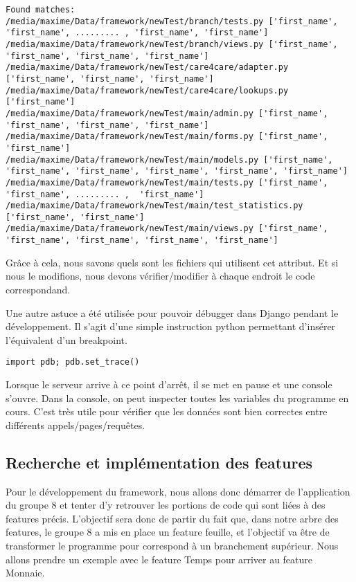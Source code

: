 \begin{lstlisting}
Found matches:
/media/maxime/Data/framework/newTest/branch/tests.py ['first_name', 'first_name', ......... , 'first_name', 'first_name']
/media/maxime/Data/framework/newTest/branch/views.py ['first_name', 'first_name', 'first_name', 'first_name']
/media/maxime/Data/framework/newTest/care4care/adapter.py ['first_name', 'first_name', 'first_name']
/media/maxime/Data/framework/newTest/care4care/lookups.py ['first_name']
/media/maxime/Data/framework/newTest/main/admin.py ['first_name', 'first_name', 'first_name', 'first_name']
/media/maxime/Data/framework/newTest/main/forms.py ['first_name', 'first_name']
/media/maxime/Data/framework/newTest/main/models.py ['first_name', 'first_name', 'first_name', 'first_name', 'first_name', 'first_name']
/media/maxime/Data/framework/newTest/main/tests.py ['first_name', 'first_name', ......... ,  'first_name']
/media/maxime/Data/framework/newTest/main/test_statistics.py ['first_name', 'first_name']
/media/maxime/Data/framework/newTest/main/views.py ['first_name', 'first_name', 'first_name', 'first_name', 'first_name']
\end{lstlisting}

Grâce à cela,  nous savons quels sont les fichiers qui utilisent cet attribut.  Et si nous le modifions,  nous devons vérifier/modifier à chaque endroit le code correspondand. 

Une autre astuce a été utilisée pour pouvoir débugger dans Django pendant le développement.  Il s'agit d'une simple instruction python permettant d'insérer l'équivalent d'un breakpoint. 
\begin{lstlisting}
import pdb; pdb.set_trace()
\end{lstlisting}
Lorsque le serveur arrive à ce point d'arrêt,  il se met en pause et une console s'ouvre.  
Dans la console,  on peut inspecter toutes les variables du programme en cours.  C'est très utile pour vérifier que les données sont bien correctes entre différents appels/pages/requêtes.

\subsection{Recherche et implémentation des features}

Pour le développement du framework,  nous allons donc démarrer de l'application du groupe 8 et tenter d'y retrouver les portions de code qui sont liées à des features précis.  L'objectif sera donc de partir du fait que,  dans notre arbre des features,  le groupe 8 a mis en place un feature feuille,  et l'objectif va être de transformer le programme pour correspond à un branchement supérieur.  Nous allons prendre un exemple avec le feature Temps pour arriver au feature Monnaie.  

